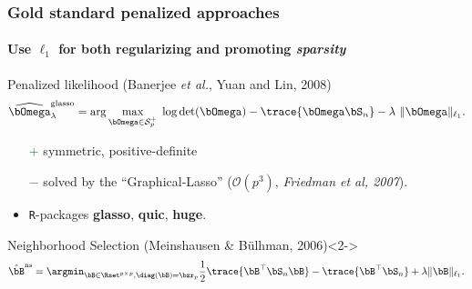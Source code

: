 \begin{frame}
  \frametitle{Gold standard penalized approaches}
  \framesubtitle{Use $\ell_1$ for both regularizing and promoting \textit{sparsity}}

  \begin{overlayarea}{\textwidth}{\textheight}

    \begin{block}{Penalized   likelihood  (Banerjee   \textit{et
          al.}, Yuan and Lin, 2008)}
      \vspace{-1em}
\begin{equation*}
  \label{eq:MLE_l1}
  \widehat{\invcov}^{\text{glasso}}_\lambda = \arg \max_{\invcov \in \mathcal{S}^+_p} \; \log
  \det(\invcov) - \trace{\invcov \empcov} -
  \lambda\ \|\invcov\|_{\ell_1}.
\end{equation*}
    \end{block}
    \vspace*{-1.5em}

    \begin{itemize}
    \item[\textcolor{green}{$+$}] symmetric, positive-definite
    \item[\textcolor{red}{$-$}]       solved      by       the
      ``Graphical-Lasso''                 ($\mathcal{O}(p^3)$,
      \textit{Friedman et al, 2007}).
    \item \texttt{R}-packages \textbf{glasso}, \textbf{quic}, \textbf{huge}.
    \end{itemize}

    \vfill

    \begin{block}{Neighborhood    Selection   (Meinshausen    \&
        B\"ulhman, 2006)}<2-> \vspace*{-1em}
\begin{equation*}
  \label{eq:MB_pseudo}
  \hat\bB^{\text{ns}}  = \argmin_{\bB\in\Rset^{p\times  p}, \diag(\bB)
    =    \bzr_p}    \frac{1}{2}    \trace{\bB^\top\empcov    \bB}    -
  \trace{\bB^\top\empcov} + \lambda \|\bB\|_{\ell_1}.
\end{equation*}
      \vspace*{-1.5em}
    \end{block}


\end{overlayarea}

\end{frame}

